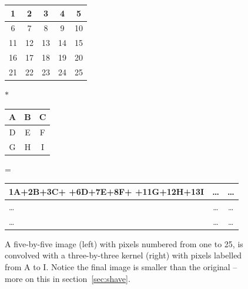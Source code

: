 \documentclass[letterpaper, 11pt]{article}
\begin{document}
\begin{figure}
	\begin{center}\begin{tabular}{|c|c|c|c|c|}
		\hline
		1&2&3&4&5\\
		\hline
		6&7&8&9&10\\
		\hline
		11&12&13&14&15\\
		\hline
		16&17&18&19&20\\
		\hline
		21&22&23&24&25\\
		\hline
	\end{tabular}
	\hspace{1mm} $\ast$ \hspace{1mm}
	\begin{tabular}{|c|c|c|}
		\hline
		A&B&C\\
		\hline
		D&E&F\\
		\hline
		G&H&I\\
		\hline
	\end{tabular}
	\hspace{1mm} = \hspace{1mm}
	\begin{tabular}{|p{2.6cm}|c|c|}
		\hline
		1A+2B+3C+ +6D+7E+8F+ +11G+12H+13I & \ldots & \ldots\\
		\hline
		\ldots &\ldots &\ldots\\
		\hline
		\ldots &\ldots &\ldots\\
		\hline
	\end{tabular}\end{center}
	\caption{A five-by-five image (left) with pixels numbered from one to 25, is convolved with a three-by-three kernel (right) with pixels labelled from A to I. Notice the final image is smaller than the original -- more on this in section~\ref{sec:shave}.}
	\label{fig:convolution_pix}
\end{figure}
\end{document}
